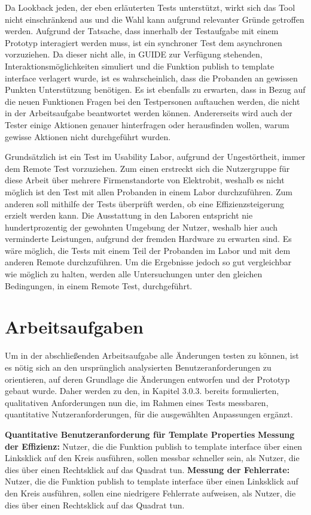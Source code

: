 Da Lookback jeden, der eben erläuterten Tests unterstützt, wirkt sich das Tool nicht einschränkend aus und die Wahl kann aufgrund relevanter Gründe getroffen werden.
Aufgrund der Tatsache, dass innerhalb der Testaufgabe mit einem Prototyp interagiert werden muss, ist ein synchroner Test dem asynchronen vorzuziehen.
Da dieser nicht alle, in GUIDE zur Verfügung stehenden, Interaktionsmöglichkeiten simuliert und die Funktion \glqq publish to template interface\grqq{} verlagert wurde, ist es wahrscheinlich, dass die Probanden an gewissen Punkten Unterstützung benötigen.
Es ist ebenfalls zu erwarten, dass in Bezug auf die neuen Funktionen Fragen bei den Testpersonen auftauchen werden, die nicht in der Arbeitsaufgabe beantwortet werden können.
Andererseits wird auch der Tester einige Aktionen genauer hinterfragen oder herausfinden wollen, warum gewisse Aktionen nicht durchgeführt wurden.

Grundsätzlich ist ein Test im Usability Labor, aufgrund der Ungestörtheit, immer dem Remote Test vorzuziehen.
Zum einen erstreckt sich die Nutzergruppe für diese Arbeit über mehrere Firmenstandorte von Elektrobit, weshalb es nicht möglich ist den Test mit allen Probanden in einem Labor durchzuführen.
Zum anderen soll mithilfe der Tests überprüft werden, ob eine Effizienzsteigerung erzielt werden kann.
Die Ausstattung in den Laboren entspricht nie hundertprozentig der gewohnten Umgebung der Nutzer, weshalb hier auch verminderte Leistungen, aufgrund der fremden Hardware zu erwarten sind.
Es wäre möglich, die Tests mit einem Teil der Probanden im Labor und mit dem anderen Remote durchzuführen.
Um die Ergebnisse jedoch so gut vergleichbar wie möglich zu halten, werden alle Untersuchungen unter den gleichen Bedingungen, in einem Remote Test, durchgeführt.

\section{Arbeitsaufgaben}
Um in der abschließenden Arbeitsaufgabe alle Änderungen testen zu können, ist es nötig sich an den ursprünglich analysierten Benutzeranforderungen zu orientieren, auf deren Grundlage die Änderungen entworfen und der Prototyp gebaut wurde.
Daher werden zu den, in Kapitel 3.0.3. bereits formulierten, qualitativen Anforderungen nun die, im Rahmen eines Tests messbaren, quantitative Nutzeranforderungen, für die ausgewählten Anpassungen ergänzt.

\textbf{Quantitative Benutzeranforderung für Template Properties}\newline
\textbf{Messung der Effizienz:}
Nutzer, die die Funktion \glqq publish to template interface\grqq{} über einen Linksklick auf den Kreis ausführen, sollen messbar schneller sein, als Nutzer, die dies über einen Rechtsklick auf das Quadrat tun. \newline
\textbf{Messung der Fehlerrate:} 
Nutzer, die die Funktion \glqq publish to template interface\grqq{} über einen Linksklick auf den Kreis ausführen, sollen eine niedrigere Fehlerrate aufweisen, als Nutzer, die dies über einen Rechtsklick auf das Quadrat tun.

